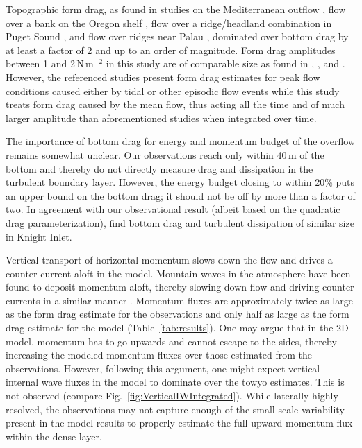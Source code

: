\documentclass{ametsocV6.1}
\begin{document}
Topographic form drag, as found in studies on the Mediterranean outflow \citep{johnsonetal94a}, flow over a bank on the Oregon shelf \citep{nashmoum01}, flow over a ridge/headland combination in Puget Sound \citep{warneretal13}, and flow over ridges near Palau \citep{johnstonetal19, voetetal20}, dominated over bottom drag by at least a factor of 2 and up to an order of magnitude.
Form drag amplitudes between 1 and 2\,N\,m$^{-2}$ in this study are of comparable size as found in \citet[][0.5 to 1.8\,N\,m$^{-2}$]{nashmoum01}, \citet[][1\,N\,m$^{-2}$]{johnstonetal19}, and \citet[][3\,N\,m$^{-2}$]{voetetal20}.
However, the referenced studies present form drag estimates for peak flow conditions caused either by tidal or other episodic flow events while this study treats form drag caused by the mean flow, thus acting all the time and of much larger amplitude than aforementioned studies when integrated over time. 

The importance of bottom drag for energy and momentum budget of the overflow remains somewhat unclear.
Our observations reach only within 40\,m of the bottom and thereby do not directly measure drag and dissipation in the turbulent boundary layer.
However, the energy budget closing to within 20\% puts an upper bound on the bottom drag; it should not be off by more than a factor of two.
In agreement with our observational result (albeit based on the quadratic drag parameterization), \citet{klymakgregg04} find bottom drag and turbulent dissipation of similar size in Knight Inlet.

Vertical transport of horizontal momentum slows down the flow and drives a counter-current aloft in the model.
Mountain waves in the atmosphere have been found to deposit momentum aloft, thereby slowing down flow and driving counter currents in a similar manner \citep{welchetal01}.
Momentum fluxes are approximately twice as large as the form drag estimate for the observations and only half as large as the form drag estimate for the model (Table~\ref{tab:results}).
One may argue that in the 2D model, momentum has to go upwards and cannot escape to the sides, thereby increasing the modeled momentum fluxes over those estimated from the observations.
However, following this argument, one might expect vertical internal wave fluxes in the model to dominate over the towyo estimates.
This is not observed (compare Fig.~\ref{fig:VerticalIWIntegrated}).
While laterally highly resolved, the observations may not capture enough of the small scale variability present in the model results to properly estimate the full upward momentum flux within the dense layer.
\end{document}
